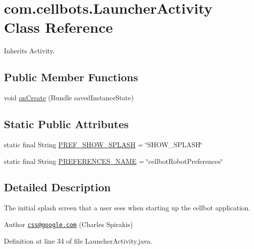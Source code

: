\hypertarget{classcom_1_1cellbots_1_1_launcher_activity}{\section{com.\-cellbots.\-Launcher\-Activity Class Reference}
\label{classcom_1_1cellbots_1_1_launcher_activity}
}


Inherits Activity.

\subsection*{Public Member Functions}
\begin{DoxyCompactItemize}
\item 
void \hyperlink{classcom_1_1cellbots_1_1_launcher_activity_a3a88ed664860e5e59513d8bbe9a4a4cd}{on\-Create} (Bundle saved\-Instance\-State)
\end{DoxyCompactItemize}
\subsection*{Static Public Attributes}
\begin{DoxyCompactItemize}
\item 
static final String \hyperlink{classcom_1_1cellbots_1_1_launcher_activity_a6178d2ea5b841742c578405ad8dcfe5e}{P\-R\-E\-F\-\_\-\-S\-H\-O\-W\-\_\-\-S\-P\-L\-A\-S\-H} = \char`\"{}S\-H\-O\-W\-\_\-\-S\-P\-L\-A\-S\-H\char`\"{}
\item 
static final String \hyperlink{classcom_1_1cellbots_1_1_launcher_activity_ad9c3f9c3530aca1b56f4045c87ee92e3}{P\-R\-E\-F\-E\-R\-E\-N\-C\-E\-S\-\_\-\-N\-A\-M\-E} = \char`\"{}cellbot\-Robot\-Preferences\char`\"{}
\end{DoxyCompactItemize}


\subsection{Detailed Description}
The initial splash screen that a user sees when starting up the cellbot application.

\begin{DoxyAuthor}{Author}
\href{mailto:css@google.com}{\tt css@google.\-com} (Charles Spirakis) 
\end{DoxyAuthor}


Definition at line 34 of file Launcher\-Activity.\-java.



